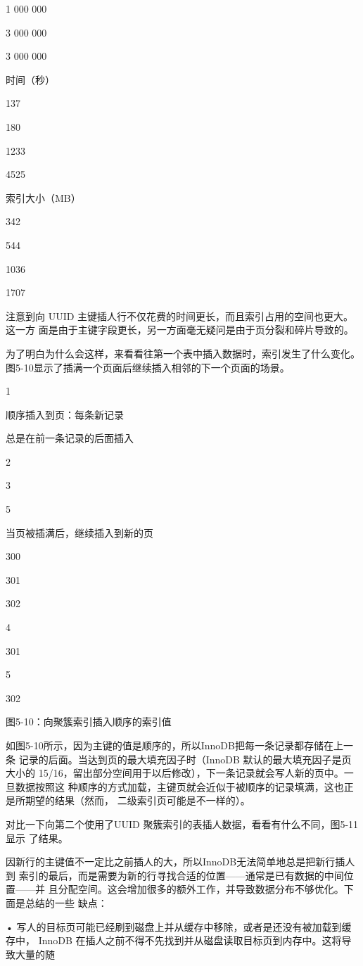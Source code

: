 1 000 000

3 000 000

3 000 000

时间（秒）

137

180

1233

4525

索引大小（MB）

342

544

1036

1707

注意到向 UUID 主键插人行不仅花费的时间更长，而且索引占用的空间也更大。这一方
面是由于主键字段更长，另一方面毫无疑问是由于页分裂和碎片导致的。

为了明白为什么会这样，来看看往第一个表中插入数据时，索引发生了什么变化。
图5-10显示了插满一个页面后继续插入相邻的下一个页面的场景。

1

顺序插入到页：每条新记录

总是在前一条记录的后面插入

2

3

5

当页被插满后，继续插入到新的页

300

301

302

4

301

5

302

图5-10：向聚簇索引插入顺序的索引值

如图5-10所示，因为主键的值是顺序的，所以InnoDB把每一条记录都存储在上一条
记录的后面。当达到页的最大填充因子时（InnoDB 默认的最大填充因子是页大小的
15/16，留出部分空间用于以后修改），下一条记录就会写人新的页中。一旦数据按照这
种顺序的方式加载，主键页就会近似于被顺序的记录填满，这也正是所期望的结果（然而，
二级索引页可能是不一样的）。

对比一下向第二个使用了UUID 聚簇索引的表插人数据，看看有什么不同，图5-11显示
了结果。

因新行的主键值不一定比之前插人的大，所以InnoDB无法简单地总是把新行插人到
索引的最后，而是需要为新的行寻找合适的位置——通常是已有数据的中间位置——并
且分配空间。这会增加很多的额外工作，并导致数据分布不够优化。下面是总结的一些
缺点：

• 写人的目标页可能已经刷到磁盘上并从缓存中移除，或者是还没有被加载到缓存中，
InnoDB 在插人之前不得不先找到并从磁盘读取目标页到内存中。这将导致大量的随

